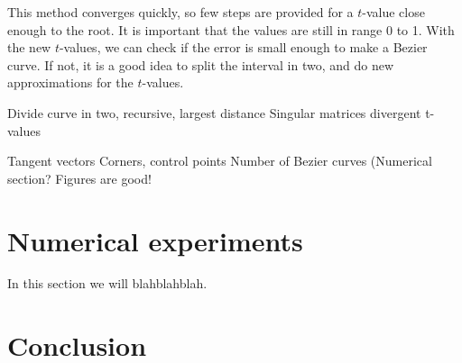 \documentclass[10pt]{article}
\begin{document}
This method converges quickly, so few steps are provided for a $t$-value close enough to the root. It is important that the values are still in range 0 to 1. With the new $t$-values, we can check if the error is small enough to make a Bezier curve. If not, it is a good idea to split the interval in two, and do new approximations for the $t$-values.








Divide curve in two, recursive, largest distance
Singular matrices
divergent t-values


Tangent vectors
Corners, control points
Number of Bezier curves (Numerical section?
Figures are good!


\section{Numerical experiments}

In this section we will blahblahblah. 



\section{Conclusion}
\cite{Plass:1983}


\end{document}
